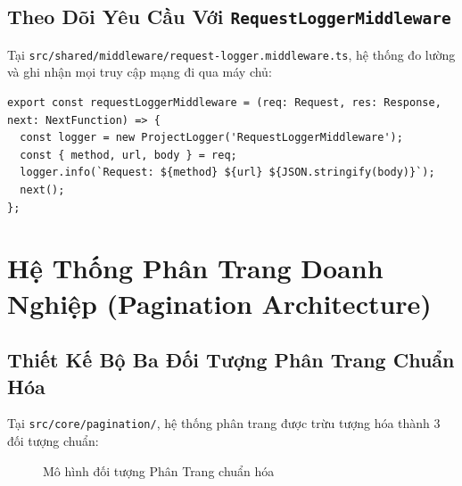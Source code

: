 \documentclass[12pt,a4paper,oneside]{book}
\begin{document}
\section{Theo Dõi Yêu Cầu Với \texttt{RequestLoggerMiddleware}}
Tại \texttt{src/shared/middleware/request-logger.middleware.ts}, hệ thống đo lường và ghi nhận mọi truy cập mạng đi qua máy chủ:
\begin{codebox}
\begin{Verbatim}[fontsize=\small]
export const requestLoggerMiddleware = (req: Request, res: Response, next: NextFunction) => {
  const logger = new ProjectLogger('RequestLoggerMiddleware');
  const { method, url, body } = req;
  logger.info(`Request: ${method} ${url} ${JSON.stringify(body)}`);
  next();
};
\end{Verbatim}
\end{codebox}

\chapter{Hệ Thống Phân Trang Doanh Nghiệp (Pagination Architecture)}

\section{Thiết Kế Bộ Ba Đối Tượng Phân Trang Chuẩn Hóa}
Tại \texttt{src/core/pagination/}, hệ thống phân trang được trừu tượng hóa thành 3 đối tượng chuẩn:

\begin{figure}[htbp]
  \centering
  \caption{Mô hình đối tượng Phân Trang chuẩn hóa}
  \label{fig:pagination-pedagogy}
\end{figure}
\end{document}
